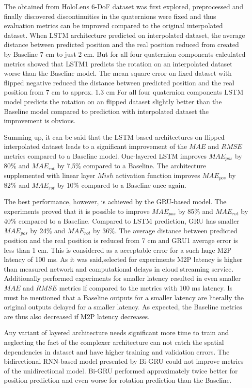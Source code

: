 The obtained from HoloLens 6-DoF dataset was first explored, preprocessed and finally discovered discontinuities in the quaternions were fixed and thus evaluation metrics can be improved compared to the original interpolated dataset. When LSTM architecture predicted on interpolated dataset, the average distance between predicted position and the real position reduced from created by Baseline 7 cm to just 2 cm. But for all four quaternion components calculated metrics showed that LSTM1 predicts the rotation on an interpolated dataset worse than the Baseline model. The mean square error on fixed dataset with flipped negative reduced the distance between predicted position and the real position from 7 cm to approx. 1.3 cm For all four quaternion components LSTM model predicts the rotation on an flipped dataset slightly better than the Baseline model compared to prediction with interpolated dataset the improvement is obvious. 

Summing up, it can be said that the LSTM-based architectures on flipped interpolated dataset leads to a significant improvement of the $MAE$ and $RMSE$ metrics compared to a Baseline model. One-layered LSTM improves $MAE_{pos}$ by 80\% and  $MAE_{rot}$ by 7,5\% compared to a Baseline. The architecture supplemented with linear layer $Mish$ activation function improves $MAE_{pos}$ by 82\% and  $MAE_{rot}$ by 10\% compared to a Baseline once again.

The best performance, however, is achieved by the GRU-based model. The experiments proved that it is possible to improve $MAE_{pos}$ by 85\% and  $MAE_{rot}$ by 40\% compared to a Baseline. Compared to LSTM prediction, GRU has smaller $MAE_{pos}$ by 24\% and  $MAE_{rot}$ by 36\%. The average distance between predicted position and the real position is reduced from 7 cm and GRU1 average error is less than 1 cm. This is considered as a acceptable error for a such huge M2P latency of 100 ms. As it was said,selected for experiments M2P latency is higher than measured network and computational delays in cloud streaming service. Additionally performed experiments for smaller latency resulted in even smaller $MAE$ and $RMSE$ metrics if compared to the metrics with 100 ms latency. Is must be mentioned that a Baseline outputs for a smaller latency are literally the original outputs delayed for a smaller latency. As expected, the Baseline metrics are thus also decreased if M2P latency decreases. 

Any variant of layered architecture needs significant more time to train and neglecting the fact of the complexer architecture can not catch the spatial dependencies in dataset and have higher training and validation errors. The bidirectional RNN-based model presented by Bi-GRU could not improve metrics of the unidirectional model. Bi-GRU performed approximately twice better for position prediction and even worse for rotation prediction than the Baseline.  


